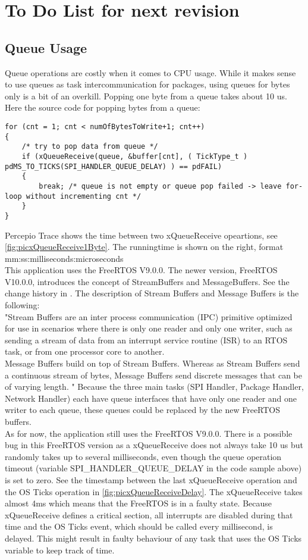 %
\section{To Do List for next revision}%
\subsection{Queue Usage}
Queue operations are costly when it comes to CPU usage. While it makes sense to use queues as task intercommunication for packages, using queues for bytes only is a bit of an overkill. Popping one byte from a queue takes about 10 us. Here the source code for popping bytes from a queue:
\begin{lstlisting}
for (cnt = 1; cnt < numOfBytesToWrite+1; cnt++)
{
    /* try to pop data from queue */
    if (xQueueReceive(queue, &buffer[cnt], ( TickType_t ) pdMS_TO_TICKS(SPI_HANDLER_QUEUE_DELAY) ) == pdFAIL)
    {
        break; /* queue is not empty or queue pop failed -> leave for-loop without incrementing cnt */
    }
}
\end{lstlisting}
%
Percepio Trace shows the time between two xQueueReceive opeartions, see \autoref{fig:picxQueueReceive1Byte}. The runningtime is shown on the right, format mm:ss:milliseconds:microseconds\\
This application uses the FreeRTOS V9.0.0. The newer version, FreeRTOS V10.0.0, introduces the concept of StreamBuffers and MessageBuffers. See the change history in \cite{ChangeLogFreeRtos}. The description of Stream Buffers and Message Buffers is the following:\\
"Stream Buffers are an inter process communication (IPC) primitive optimized for use in scenarios where there is only one reader and only one writer, such as sending a stream of data from an interrupt service routine (ISR) to an RTOS task, or from one processor core to another.\\
Message Buffers build on top of Stream Buffers. Whereas as Stream Buffers send a continuous stream of bytes, Message Buffers send discrete messages that can be of varying length. " \cite{DescriptionFreeRtosBuffers}
Because the three main tasks (SPI Handler, Package Handler, Network Handler) each have queue interfaces that have only one reader and one writer to each queue, these queues could be replaced by the new FreeRTOS buffers. \\
As for now, the application still uses the FreeRTOS V9.0.0. There is a possible bug in this FreeRTOS version as a xQueueReceive does not always take 10 us but randomly takes up to several milliseconds, even though the queue operation timeout (variable SPI\_HANDLER\_QUEUE\_DELAY in the code sample above) is set to zero. See the timestamp between the last xQueueReceive operation and the OS Ticks operation in \autoref{fig:picxQueueReceiveDelay}. The xQueueReceive takes almost 4ms which means that the FreeRTOS is in a faulty state. Because xQueueReceive defines a critical section, all interrupts are disabled during that time and the OS Ticks event, which should be called every millisecond, is delayed. This might result in faulty behaviour of any task that uses the OS Ticks variable to keep track of time. 
